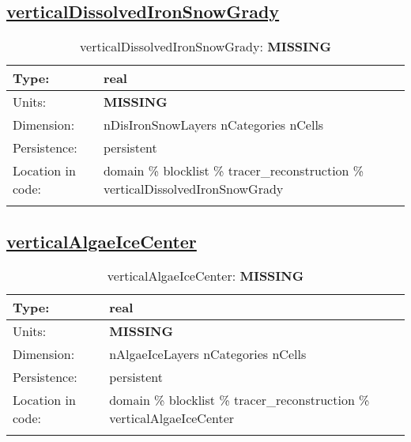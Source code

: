 \subsection[verticalDissolvedIronSnowGrady]{\hyperref[sec:var_tab_tracer_reconstruction]{verticalDissolvedIronSnowGrady}}
\label{subsec:var_sec_tracer_reconstruction_verticalDissolvedIronSnowGrady}
\begin{center}
\begin{longtable}{| p{2.0in} | p{4.0in} |}
        \hline 
        Type: & real \\
        \hline 
        Units: & {\bf \color{red} MISSING} \\
        \hline 
        Dimension: & nDisIronSnowLayers nCategories nCells \\
        \hline 
        Persistence: & persistent \\
        \hline 
         Location in code: & domain \% blocklist \% tracer\_reconstruction \% verticalDissolvedIronSnowGrady \\
         \hline 
    \caption{verticalDissolvedIronSnowGrady: {\bf \color{red} MISSING}}
\end{longtable}
\end{center}
\subsection[verticalAlgaeIceCenter]{\hyperref[sec:var_tab_tracer_reconstruction]{verticalAlgaeIceCenter}}
\label{subsec:var_sec_tracer_reconstruction_verticalAlgaeIceCenter}
\begin{center}
\begin{longtable}{| p{2.0in} | p{4.0in} |}
        \hline 
        Type: & real \\
        \hline 
        Units: & {\bf \color{red} MISSING} \\
        \hline 
        Dimension: & nAlgaeIceLayers nCategories nCells \\
        \hline 
        Persistence: & persistent \\
        \hline 
         Location in code: & domain \% blocklist \% tracer\_reconstruction \% verticalAlgaeIceCenter \\
         \hline 
    \caption{verticalAlgaeIceCenter: {\bf \color{red} MISSING}}
\end{longtable}
\end{center}
